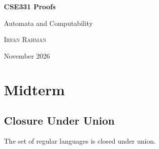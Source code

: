 \documentclass[11pt]{scrreprt}
\begin{document}
\begin{titlepage}
    \centering
    \vspace*{\fill}
    
    {\LARGE\bfseries CSE331 Proofs\par}

    \vspace{0.5cm}

    {\large Automata and Computability\par}

    \vspace{1.5cm}

    {\large\scshape Irfan Rahman\par}

    \vspace{0.7cm}

    {\small November 2026\par}

    \vspace*{\fill}
\end{titlepage}

\setcounter{page}{1}
\tableofcontents
\clearpage

\setcounter{page}{1}
\chapter{Midterm}



\section{Closure Under Union}
\begin{theorem*}
    The set of regular languages is closed under union.
\end{theorem*}
\end{document}
